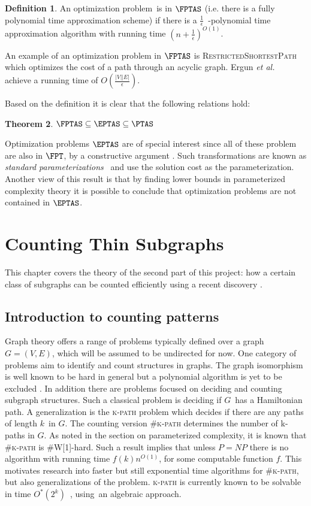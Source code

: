 \documentclass[a4paper,11pt]{report}
\theoremstyle{plain}
\newtheorem{thm}{Theorem}[chapter] %
\theoremstyle{definition}
\newtheorem{defn}[thm]{Definition} %
\begin{document}
\begin{defn}
An optimization problem is in $\FPTAS$ (i.e. there is a fully polynomial time approximation scheme) if there is a $\frac{1}{\epsilon}$ -polynomial time approximation algorithm with 
running time $(n + \frac{1}{\epsilon})^{O(1)}$.
\end{defn}

An example of an optimization problem in $\FPTAS$ is \textsc{RestrictedShortestPath} which optimizes the cost of a path through an acyclic graph.
Ergun \emph{et al.}~\cite{ergun02} achieve a running time of $O(\frac{|V| |E|}{\epsilon})$.

Based on the definition it is clear that the following relations hold:

\begin{thm}
$\FPTAS \subseteq \EPTAS \subseteq \PTAS$
\end{thm}

Optimization problems $\EPTAS$ are of special interest since all of these problem are also in $\FPT$, by a constructive argument \cite{FG06}.
Such transformations are known as \emph{standard parameterizations} \cite{FG06} and use the solution cost as the parameterization.
Another view of this result is that by finding lower bounds in parameterized complexity theory it is possible to conclude that optimization problems are not contained in $\EPTAS$.


\chapter{Counting Thin Subgraphs}
This chapter covers the theory of the second part of this project: how a certain class of subgraphs can be counted efficiently using a recent discovery \cite{BHKK13}.

\section{Introduction to counting patterns}
Graph theory offers a range of problems typically defined over a graph $G = (V, E)$, which will be assumed to be undirected for now.
One category of problems aim to identify and count structures in graphs.
The graph isomorphism is well known to be hard in general but a polynomial algorithm is yet to be excluded \cite{KOBLER94}.
In addition there are problems focused on deciding and counting subgraph structures.
Such a classical problem is deciding if $G$ has a Hamiltonian path.
A generalization is the \textsc{k-path} problem which decides if there are any paths of length $k$ in $G$.
The counting version \textsc{\#k-path} determines the number of k-paths in $G$.
As noted in the section on parameterized complexity, it is known that \textsc{\#k-path} is \textsc{\#W[1]}-hard.
Such a result implies that unless $P=NP$ there is no algorithm with running time $f(k)n^{O(1)}$, for some computable function $f$.
This motivates research into faster but still exponential time algorithms for \textsc{\#k-path}, but also generalizations of the problem.
\textsc{k-path} is currently known to be solvable in time $O^*(2^k)$ \cite{W09}, using an algebraic approach.
\end{document}
